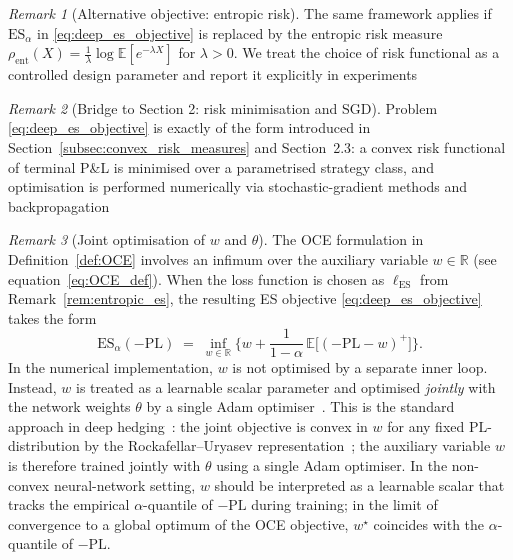 \documentclass[12pt,a4paper]{article}
\theoremstyle{definition}
\theoremstyle{plain}
\theoremstyle{remark}
\newtheorem{remark}{Remark}[section]
\theoremstyle{plain}
\begin{document}
\begin{remark}[Alternative objective: entropic risk]
\label{rem:deep_objective_entropic}
The same framework applies if $\mathrm{ES}_{\alpha}$ in \eqref{eq:deep_es_objective} is replaced by the entropic risk measure
$\rho_{\mathrm{ent}}(X)=\frac{1}{\lambda}\log\mathbb{E}[e^{-\lambda X}]$ for $\lambda>0$.
We treat the choice of risk functional as a controlled design parameter and report it explicitly in experiments \cite{FoellmerSchied2016,Buehler2019DeepHedging}
\end{remark}

\begin{remark}[Bridge to Section 2: risk minimisation and SGD]
\label{rem:bridge_to_sgd}
Problem \eqref{eq:deep_es_objective} is exactly of the form introduced in Section~\ref{subsec:convex_risk_measures} and Section~2.3:
a convex risk functional of terminal P\&L is minimised over a parametrised strategy class,
and optimisation is performed numerically via stochastic-gradient methods and backpropagation \cite{FoellmerSchied2016,Buehler2019DeepHedging,Horvath2021DeepRough}
\end{remark}

\begin{remark}[Joint optimisation of $w$ and $\theta$]
\label{rem:joint_w_theta}
The OCE formulation in Definition~\ref{def:OCE} involves an infimum over
the auxiliary variable $w \in \mathbb{R}$ (see equation~\eqref{eq:OCE_def}).
When the loss function is chosen as $\ell_{\mathrm{ES}}$ from
Remark~\ref{rem:entropic_es}, the resulting ES objective
\eqref{eq:deep_es_objective} takes the form
\[
  \mathrm{ES}_\alpha(-\mathrm{PL})
  \;=\;
  \inf_{w \in \mathbb{R}}
  \biggl\{
    w + \frac{1}{1 - \alpha}\,
    \mathbb{E}\bigl[(-\mathrm{PL} - w)^{+}\bigr]
  \biggr\}.
\]
In the numerical implementation, $w$ is not optimised by a separate
inner loop. Instead, $w$ is treated as a learnable scalar parameter
and optimised \emph{jointly} with the network weights $\theta$ by a
single Adam optimiser~\cite{KingmaBa2015Adam}. This is the standard
approach in deep hedging~\cite{Buehler2019DeepHedging}: the joint objective is convex in $w$ for any fixed $\mathrm{PL}$-distribution by the Rockafellar--Uryasev representation~\cite{RockafellarUryasev2000};
the auxiliary variable $w$ is therefore trained jointly with $\theta$ using a single Adam optimiser. In the non-convex neural-network setting, $w$ should be interpreted as a learnable scalar that tracks the empirical $\alpha$-quantile of $-\mathrm{PL}$ during training; in the limit of convergence to a global optimum of the OCE objective, $w^\star$ coincides with the $\alpha$-quantile of $-\mathrm{PL}$.
\end{remark}
\end{document}

